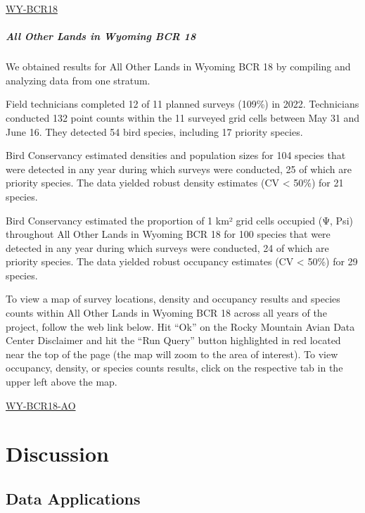 \documentclass[
  letterpaper,
  DIV=11,
  numbers=noendperiod,
  oneside]{scrreprt}
\begin{document}
\href{http://www.rmbo.org/new_site/adc/QueryWindow.aspx\#N4IgzgrgDgpgTmALnAhoiBbEAuABCAdQE0BaAIQGEAlARgA4QBfIA===}{WY-BCR18}

\hypertarget{all-other-lands-in-wyoming-bcr-18}{%
\subsubsection{All Other Lands in Wyoming BCR
18}\label{all-other-lands-in-wyoming-bcr-18}}

We obtained results for All Other Lands in Wyoming BCR 18 by compiling
and analyzing data from one stratum.

Field technicians completed 12 of 11 planned surveys (109\%) in 2022.
Technicians conducted 132 point counts within the 11 surveyed grid cells
between May 31 and June 16. They detected 54 bird species, including 17
priority species.

Bird Conservancy estimated densities and population sizes for 104
species that were detected in any year during which surveys were
conducted, 25 of which are priority species. The data yielded robust
density estimates (CV \textless{} 50\%) for 21 species.

Bird Conservancy estimated the proportion of 1 km² grid cells occupied
(Ψ, Psi) throughout All Other Lands in Wyoming BCR 18 for 100 species
that were detected in any year during which surveys were conducted, 24
of which are priority species. The data yielded robust occupancy
estimates (CV \textless{} 50\%) for 29 species.

To view a map of survey locations, density and occupancy results and
species counts within All Other Lands in Wyoming BCR 18 across all years
of the project, follow the web link below. Hit ``Ok'' on the Rocky
Mountain Avian Data Center Disclaimer and hit the ``Run Query'' button
highlighted in red located near the top of the page (the map will zoom
to the area of interest). To view occupancy, density, or species counts
results, click on the respective tab in the upper left above the map.

\href{http://www.rmbo.org/new_site/adc/QueryWindow.aspx\#N4IgzgLgTghhCuBbEAuABCA6gTQLQCEBhAJQEYAOXAQQHl0qAbBtGiACwFMo0AZGAOwAmYEAF8gA}{WY-BCR18-AO}

\part{Discussion}

\hypertarget{data-applications}{%
\chapter{Data Applications}\label{data-applications}}
\end{document}
